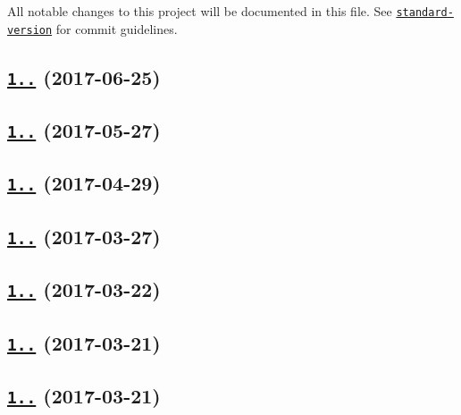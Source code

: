 All notable changes to this project will be documented in this file. See \href{https://github.com/conventional-changelog/standard-version}{\tt standard-\/version} for commit guidelines.

\label{_1.1.10}%
 \subsection*{\href{https://github.com/istanbuljs/istanbuljs/compare/istanbul-api@1.1.9...istanbul-api@1.1.10}{\tt 1..} (2017-\/06-\/25)}

\label{_1.1.9}%
 \subsection*{\href{https://github.com/istanbuljs/istanbuljs/compare/istanbul-api@1.1.8...istanbul-api@1.1.9}{\tt 1..} (2017-\/05-\/27)}

\label{_1.1.8}%
 \subsection*{\href{https://github.com/istanbuljs/istanbul-api/compare/istanbul-api@1.1.7...istanbul-api@1.1.8}{\tt 1..} (2017-\/04-\/29)}

\label{_1.1.7}%
 \subsection*{\href{https://github.com/istanbuljs/istanbul-api/compare/istanbul-api@1.1.6...istanbul-api@1.1.7}{\tt 1..} (2017-\/03-\/27)}

\label{_1.1.6}%
 \subsection*{\href{https://github.com/istanbuljs/istanbul-api/compare/istanbul-api@1.1.5...istanbul-api@1.1.6}{\tt 1..} (2017-\/03-\/22)}

\label{_1.1.5}%
 \subsection*{\href{https://github.com/istanbuljs/istanbul-api/compare/istanbul-api@1.1.4...istanbul-api@1.1.5}{\tt 1..} (2017-\/03-\/21)}

\label{_1.1.4}%
 \subsection*{\href{https://github.com/istanbuljs/istanbul-api/compare/istanbul-api@1.1.3...istanbul-api@1.1.4}{\tt 1..} (2017-\/03-\/21)}

